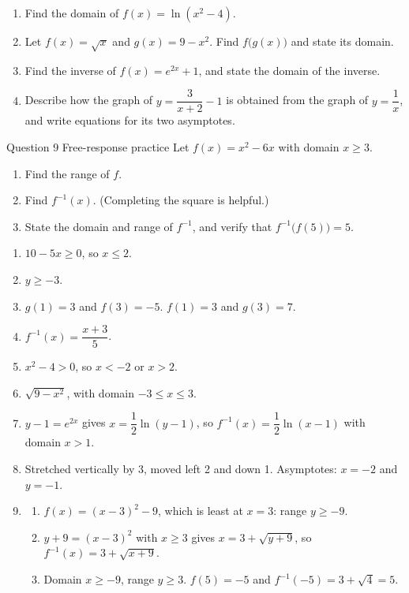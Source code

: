 \documentclass[11pt]{article}
\begin{document}
\begin{enumerate}[leftmargin=*,itemsep=2pt,start=5]
  \item Find the domain of $f(x)=\ln\!\left(x^2-4\right)$.\work{2.8cm}
  \item Let $f(x)=\sqrt{x}$ and $g(x)=9-x^2$. Find $f\big(g(x)\big)$ and state its domain.\work{2.8cm}
  \item Find the inverse of $f(x)=e^{2x}+1$, and state the domain of the inverse.\work{2.8cm}
  \item Describe how the graph of $y=\dfrac{3}{x+2}-1$ is obtained from the graph of $y=\dfrac1x$, and write equations for its two asymptotes.\work{2.8cm}
\end{enumerate}

\begin{frbox}{Question 9 \textperiodcentered{} Free-response practice}
Let $f(x)=x^2-6x$ with domain $x\ge3$.
\begin{enumerate}[label=(\alph*),leftmargin=*,itemsep=2pt]
  \item Find the range of $f$.\work{2.6cm}
  \item Find $f^{-1}(x)$. (Completing the square is helpful.)\work{2.6cm}
  \item State the domain and range of $f^{-1}$, and verify that $f^{-1}\big(f(5)\big)=5$.\work{2.6cm}
\end{enumerate}
\end{frbox}

\newpage
\begin{solbox}
\begin{enumerate}[leftmargin=*,itemsep=4pt]
  \item $10-5x\ge0$, so $x\le2$.
  \item $y\ge-3$.
  \item $g(1)=3$ and $f(3)=-5$. $f(1)=3$ and $g(3)=7$.
  \item $f^{-1}(x)=\dfrac{x+3}{5}$.
  \item $x^2-4>0$, so $x<-2$ or $x>2$.
  \item $\sqrt{9-x^2}$, with domain $-3\le x\le3$.
  \item $y-1=e^{2x}$ gives $x=\dfrac12\ln(y-1)$, so $f^{-1}(x)=\dfrac12\ln(x-1)$ with domain $x>1$.
  \item Stretched vertically by 3, moved left 2 and down 1. Asymptotes: $x=-2$ and $y=-1$.
  \item \begin{enumerate}[label=(\alph*),leftmargin=*,itemsep=3pt]
    \item $f(x)=(x-3)^2-9$, which is least at $x=3$: range $y\ge-9$.
    \item $y+9=(x-3)^2$ with $x\ge3$ gives $x=3+\sqrt{y+9}$, so $f^{-1}(x)=3+\sqrt{x+9}$.
    \item Domain $x\ge-9$, range $y\ge3$. $f(5)=-5$ and $f^{-1}(-5)=3+\sqrt4=5$.
  \end{enumerate}
\end{enumerate}
\end{solbox}
\end{document}
